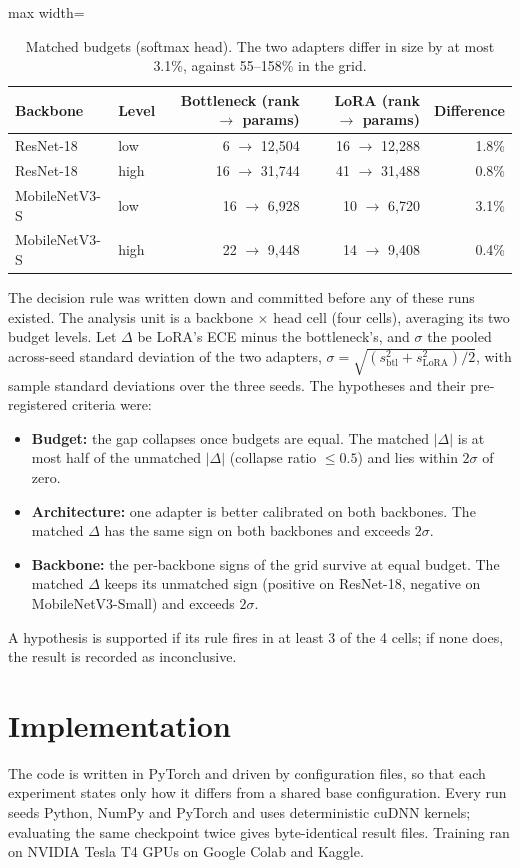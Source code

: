 \begin{table}[H]
\centering
\caption{Matched budgets (softmax head). The two adapters differ in size by at most 3.1\%, against 55--158\%
in the grid.}
\label{tab:matched-budgets}
\begin{adjustbox}{max width=\textwidth}
\begin{tabular}{@{}llrrr@{}}
\toprule
Backbone & Level & Bottleneck (rank $\rightarrow$ params) & LoRA (rank $\rightarrow$ params) & Difference \\
\midrule
ResNet-18 & low & 6 $\rightarrow$ 12,504 & 16 $\rightarrow$ 12,288 & 1.8\% \\
ResNet-18 & high & 16 $\rightarrow$ 31,744 & 41 $\rightarrow$ 31,488 & 0.8\% \\
MobileNetV3-S & low & 16 $\rightarrow$ 6,928 & 10 $\rightarrow$ 6,720 & 3.1\% \\
MobileNetV3-S & high & 22 $\rightarrow$ 9,448 & 14 $\rightarrow$ 9,408 & 0.4\% \\
\bottomrule
\end{tabular}
\end{adjustbox}
\end{table}

The decision rule was written down and committed before any of these runs existed. The analysis unit is
a backbone $\times$ head cell (four cells), averaging its two budget levels. Let $\Delta$ be LoRA's ECE minus
the bottleneck's, and $\sigma$ the pooled across-seed standard deviation of the two adapters,
$\sigma = \sqrt{(s_{\text{btl}}^2 + s_{\text{LoRA}}^2)/2}$, with sample standard deviations over the
three seeds. The hypotheses and their pre-registered criteria were:
\begin{itemize}
\item \textbf{Budget:} the gap collapses once budgets are equal. The matched $|\Delta|$ is at most half of
the unmatched $|\Delta|$ (collapse ratio $\le 0.5$) and lies within $2\sigma$ of zero.
\item \textbf{Architecture:} one adapter is better calibrated on both backbones. The matched $\Delta$ has the
same sign on both backbones and exceeds $2\sigma$.
\item \textbf{Backbone:} the per-backbone signs of the grid survive at equal budget. The matched $\Delta$
keeps its unmatched sign (positive on ResNet-18, negative on MobileNetV3-Small) and exceeds $2\sigma$.
\end{itemize}
A hypothesis is supported if its rule fires in at least 3 of the 4 cells; if none does, the result is
recorded as inconclusive.

\section{Implementation}

The code is written in PyTorch and driven by configuration files, so that each experiment states only
how it differs from a shared base configuration. Every run seeds Python, NumPy and PyTorch and uses
deterministic cuDNN kernels; evaluating the same checkpoint twice gives byte-identical result files.
Training ran on NVIDIA Tesla T4 GPUs on Google Colab and Kaggle.
